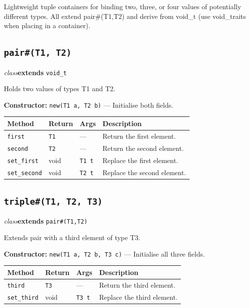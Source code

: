 \documentclass[11pt,letterpaper]{report}
\begin{document}
Lightweight tuple containers for binding two, three, or four values of potentially different types. All extend pair\#(T1,T2) and derive from void\_t (use void\_traits when placing in a container).

\subsection*{\texttt{pair\#(T1, T2)}}
\noindent\small\textit{class}\quad \textbf{extends} \texttt{void\_t}\par

Holds two values of types T1 and T2.

\noindent\textbf{Constructor:} \texttt{new(T1 a, T2 b)} --- Initialise both fields.

\begin{xltabular}{\linewidth}{>{\small}p{1.35in} >{\small}p{1.25in} >{\small}p{0.95in} >{\small}X}
\toprule
\textbf{Method} & \textbf{Return} & \textbf{Args} & \textbf{Description} \\
\midrule
\endhead
\bottomrule
\endfoot
\texttt{first} & \texttt{T1} & --- & Return the first element. \\
\texttt{second} & \texttt{T2} & --- & Return the second element. \\
\texttt{set\_first} & void & \texttt{T1 t} & Replace the first element. \\
\texttt{set\_second} & void & \texttt{T2 t} & Replace the second element. \\
\end{xltabular}

\subsection*{\texttt{triple\#(T1, T2, T3)}}
\noindent\small\textit{class}\quad \textbf{extends} \texttt{pair\#(T1,T2)}\par

Extends pair with a third element of type T3.

\noindent\textbf{Constructor:} \texttt{new(T1 a, T2 b, T3 c)} --- Initialise all three fields.

\begin{xltabular}{\linewidth}{>{\small}p{1.35in} >{\small}p{1.25in} >{\small}p{0.95in} >{\small}X}
\toprule
\textbf{Method} & \textbf{Return} & \textbf{Args} & \textbf{Description} \\
\midrule
\endhead
\bottomrule
\endfoot
\texttt{third} & \texttt{T3} & --- & Return the third element. \\
\texttt{set\_third} & void & \texttt{T3 t} & Replace the third element. \\
\end{xltabular}
\end{document}

